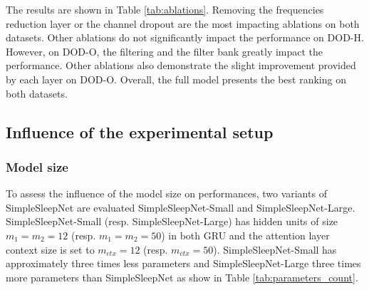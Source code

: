 \documentclass[journal]{IEEEtran}
\begin{document}
The results are shown in Table \ref{tab:ablations}. 
Removing the frequencies reduction layer or the channel dropout are the most impacting ablations on both datasets. Other ablations do not significantly impact the performance on DOD-H. However, on DOD-O, the filtering and the filter bank greatly impact the performance. Other ablations also demonstrate the slight improvement provided by each layer on DOD-O. Overall, the full model presents the best ranking on both datasets.

\subsection{Influence of the experimental setup}

\subsubsection{Model size}
To assess the influence of the model size on performances, two variants of SimpleSleepNet are evaluated SimpleSleepNet-Small and SimpleSleepNet-Large. SimpleSleepNet-Small  (resp. SimpleSleepNet-Large) has hidden units of size $m_1 = m_2 =12$ (resp. $m_1= m_2 =50$) in both GRU and the attention layer context size is set to $m_{ctx} = 12$ (resp. $m_{ctx} =50$). SimpleSleepNet-Small has approximately three times less parameters and SimpleSleepNet-Large three times more parameters than SimpleSleepNet as show in Table \ref{tab:parameters_count}. 

\begin{table}[ht]
\centering
{}
\caption{Performance metrics of SimpleSleepNet variants with smaller (SimpleSleepNet-Small) and larger (SimpleSleepNet-Large) layer size than the original models. }
\label{tab:model_size}
\vspace{-2em}
\end{table}
 
\end{document}
